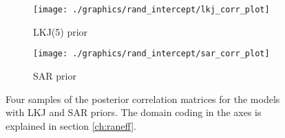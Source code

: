 \begin{figure}
    \begin{subfigure}{\linewidth}
        \centering
        \texttt{[image: ./graphics/rand\_intercept/lkj\_corr\_plot]}
        \caption{LKJ(5) prior}
        \label{fig:heatmap_lkj}
    \end{subfigure}
    \begin{subfigure}{\linewidth}
        \centering
        \texttt{[image: ./graphics/rand\_intercept/sar\_corr\_plot]}
        \caption{SAR prior}
        \label{fig:heatmap_sar}
    \end{subfigure}
    \caption[Correlation matrices for the LKJ and SAR priors.]{Four samples of the posterior correlation matrices for the models with LKJ and SAR priors. The domain coding in the axes is explained in section \ref{ch:raneff}.}
    \label{fig:corr_heatmap}
\end{figure}

